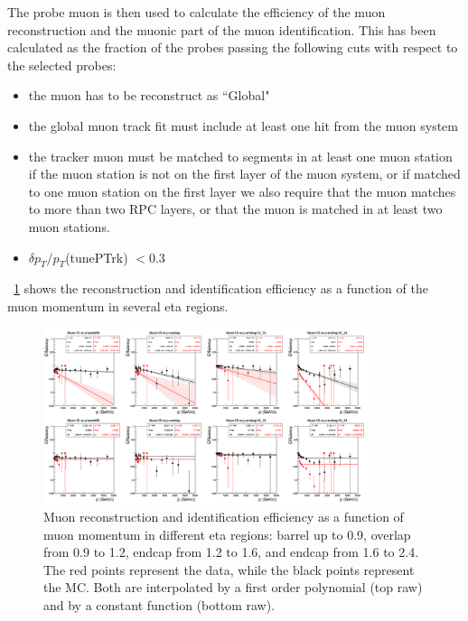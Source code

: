 The probe muon is then used to calculate the efficiency of the muon reconstruction and the muonic part of the muon identification. This has been calculated as the fraction of the probes passing the following cuts with respect to the selected probes:
\begin{itemize}
\item the muon has to be reconstruct as ``Global"  
\item the global muon track fit must include at least one hit from the muon system
\item the tracker muon must be matched to segments in at least one muon station if the muon station is not on the first layer of the muon system, or if matched to one muon station on the first layer we also require that the muon matches to more than two RPC layers, or that the muon is matched in at least two muon stations. 
\item $\delta{p_T}/p_T$(tunePTrk) $<0.3$
\end{itemize}
\figurename~\ref{fig_reco_p} shows the reconstruction and identification efficiency as a function of the muon momentum in several eta regions. 
\begin{figure}[htbp]
\centering
\includegraphics[width=0.85\textwidth]{Images/Cap5/FitUpTo6000_Pol1_MuonIDVsP_DataAll.png}
\caption{Muon reconstruction and identification efficiency as a function of muon momentum in different eta regions: barrel up to 0.9, overlap from 0.9 to 1.2, endcap from 1.2 to 1.6, and endcap from 1.6 to 2.4. The red points represent the data, while the black points represent the MC. Both are interpolated by a first order polynomial (top raw) and by a constant function (bottom raw). %
}
\label{fig_reco_p}
\end{figure}

